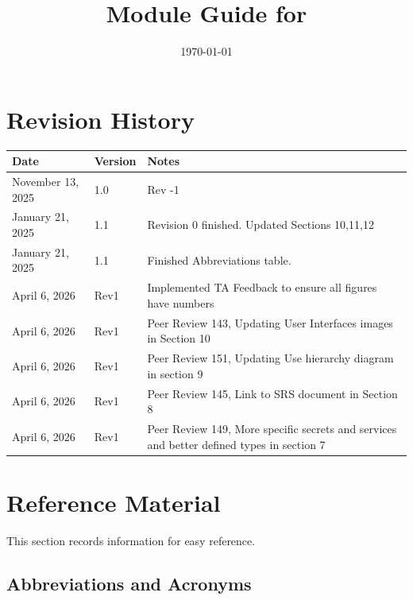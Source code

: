 \documentclass[12pt, titlepage]{article}
\begin{document}
\title{Module Guide for \progname{}} 
\author{\authname}
\date{\today}

\maketitle


\section{Revision History}

\begin{tabularx}{\textwidth}{p{3cm}p{2cm}X}
\toprule {\bf Date} & {\bf Version} & {\bf Notes}\\
\midrule
November 13, 2025 & 1.0 & Rev -1\\
January 21, 2025 & 1.1 & Revision 0 finished. Updated Sections 10,11,12\\
January 21, 2025 & 1.1 & Finished Abbreviations table.\\
April 6, 2026 & Rev1 & Implemented TA Feedback to ensure all figures have numbers\\
April 6, 2026 & Rev1 & Peer Review 143, Updating User Interfaces images in Section 10\\
April 6, 2026 & Rev1 & Peer Review 151, Updating Use hierarchy diagram in section 9\\
April 6, 2026 & Rev1 & Peer Review 145, Link to SRS document in Section 8\\
April 6, 2026 & Rev1 & Peer Review 149, More specific secrets and services and better defined types in section 7 \\
\bottomrule
\end{tabularx}

\newpage

\section{Reference Material}

This section records information for easy reference.

\subsection{Abbreviations and Acronyms}
\end{document}
